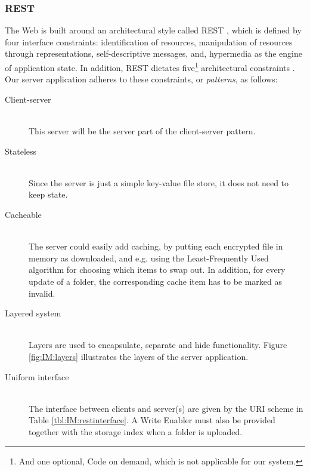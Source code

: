 \documentclass[pdftex,english,10pt,b5paper,twoside]{book}
\begin{document}
\subsubsection{\acs{REST}} The Web is built around an architectural style called
\ac{REST} \cite[ch. 5]{fielding}, which is defined by four interface
constraints: identification of resources, manipulation of resources through
representations, self-descriptive messages, and, hypermedia as the engine of
application state. In addition, \ac{REST} dictates five\footnote{And one
optional, Code on demand, which is not applicable for our system.} architectural
constraints \cite{fielding}. Our server application adheres to these
constraints, or \emph{patterns}, as follows:

\begin{description}
  \item[Client-server] \hfill \\
    This server will be the server part of the client-server pattern.

  \item[Stateless] \hfill \\
    Since the server is just a simple key-value file store, it does
    not need to keep state.

  \item[Cacheable] \hfill \\
    The server could easily add caching, by putting each encrypted file in
    memory as downloaded, and e.g. using the Least-Frequently Used algorithm for
    choosing which items to swap out. In addition, for every update of a folder,
    the corresponding cache item has to be marked as invalid.

  \item[Layered system] \hfill \\
    Layers are used to encapsulate, separate and hide functionality.
    Figure \ref{fig:IM:layers} illustrates the layers of the server application.

  \item[Uniform interface] \hfill \\
    The interface between clients and server(s) are given by the URI scheme in
    Table \ref{tbl:IM:restinterface}. A Write Enabler
    must also be provided together with the storage index when a folder is
    uploaded.
\end{description}
\end{document}
